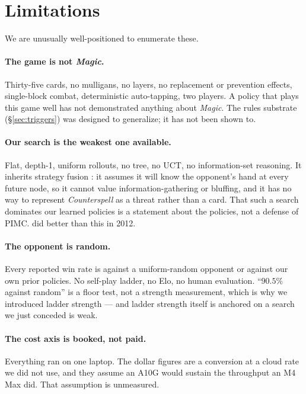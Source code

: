 \documentclass[11pt]{article}
\begin{document}
\section{Limitations}

We are unusually well-positioned to enumerate these.

\paragraph{The game is not \textit{Magic}.} Thirty-five cards, no mulligans, no layers, no replacement or prevention effects, single-block combat, deterministic auto-tapping, two players. A policy that plays this game well has not demonstrated anything about \textit{Magic}. The rules substrate (\S\ref{sec:triggers}) was designed to generalize; it has not been shown to.

\paragraph{Our search is the weakest one available.} Flat, depth-1, uniform rollouts, no tree, no UCT, no information-set reasoning. It inherits strategy fusion \citep{frank1998bridge}: it assumes it will know the opponent's hand at every future node, so it cannot value information-gathering or bluffing, and it has no way to represent \textit{Counterspell} as a threat rather than a card. That such a search dominates our learned policies is a statement about the policies, not a defense of PIMC. \citet{cowling2012magic} did better than this in 2012.

\paragraph{The opponent is random.} Every reported win rate is against a uniform-random opponent or against our own prior policies. No self-play ladder, no Elo, no human evaluation. ``$90.5\%$ against random'' is a floor test, not a strength measurement, which is why we introduced ladder strength --- and ladder strength itself is anchored on a search we just conceded is weak.

\paragraph{The cost axis is booked, not paid.} Everything ran on one laptop. The dollar figures are a conversion at a cloud rate we did not use, and they assume an A10G would sustain the throughput an M4 Max did. That assumption is unmeasured.
\end{document}
